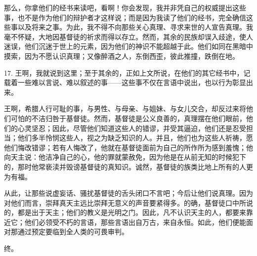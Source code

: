 那么，你拿他们的经书来读吧，看啊！你会发现，我并非凭自己的权威提出这些事，也不是作为他们的辩护者才这样说；而是因为我读了他们的经书，完全确信这些事以及将来之事。为此，我不得不向那些关心真理、寻求来世的人宣告真理。我毫不怀疑，大地因基督徒的祈求而得以存立。然而，其余的民族却误入歧途，使人迷误，他们沉迷于世上的元素，因为他们的神识不能超越于此。他们如同在黑暗中摸索，因为不愿认识真理；又像醉酒之人，东倒西歪，彼此推撞，跌倒在地。\par

17. 王啊，我就说到这里；至于其余的，正如上文所说，在他们的其它经书中，记载着一些难以言说、难以叙述的事——这些事不仅在言语中说出，也以行为彰显出来。\par

王啊，希腊人行可耻的事，与男性、与母亲、与姐妹、与女儿交合，却反过来将他们可怕的不洁归咎于基督徒。然而，基督徒是公义良善的，真理摆在他们眼前，他们的心灵坚忍；因此，尽管他们知道这些人的错谬，并受其逼迫，他们还是忍受担当；他们多半怜悯这些人，视之为缺乏知识的人。并且，他们也为这些人祈祷，愿他们悔改错谬；若有人悔改了，他就在基督徒面前为自己的所作所为感到羞愧；他向天主说：他洁净自己的心，他的罪就蒙赦免，因为他是在从前无知的时候犯下的，那时他常亵渎并毁谤基督徒的真知识。诚然，基督徒的族类比地上所有的人更为有福。\par

从此，让那些说虚妄话、骚扰基督徒的舌头闭口不言吧；今后让他们说真理。因为对他们而言，崇拜真天主远比崇拜无意义的声音要紧得多。的确，基督徒口中所说的，都是出于天主；他们的教义是光明之门。因此，凡不认识天主的人，都要来靠近它；他们必领受不朽的言语，那些言语出自万古，来自永恒。如此，他们便能面对那通过预定要临到全人类的可畏审判。\par

终。\par

